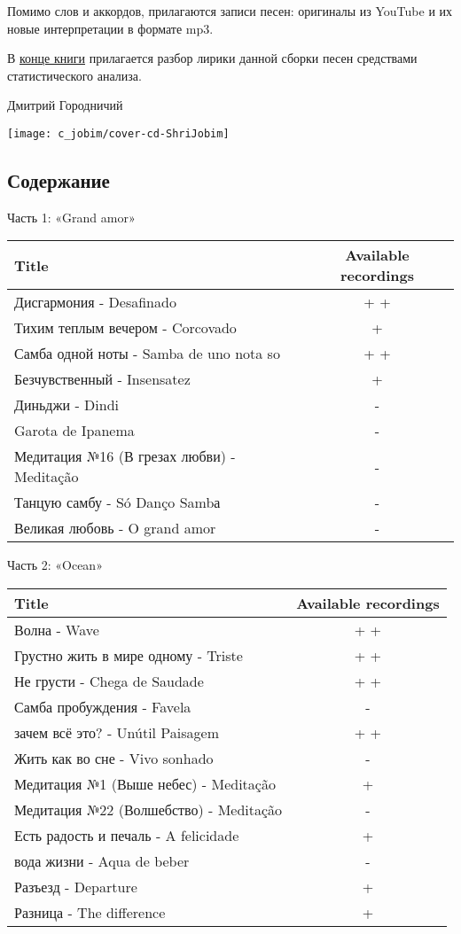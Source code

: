 \documentclass[
]{article}
\begin{document}
Помимо слов и аккордов, прилагаются записи песен: оригиналы из YouTube и их новые интерпретации в формате mp3.

В \href{TextMining.html}{конце книги} прилагается разбор лирики данной сборки песен средствами статистического анализа.

Дмитрий Городничий

\begin{center}\texttt{[image: c\_jobim/cover-cd-ShriJobim]} \end{center}

\hypertarget{ux441ux43eux434ux435ux440ux436ux430ux43dux438ux435}{%
\subsection*{Содержание}\label{ux441ux43eux434ux435ux440ux436ux430ux43dux438ux435}}

Часть 1: «Grand amor»

\begin{longtable}[]{@{}lc@{}}
\toprule
Title & Available recordings\tabularnewline
\midrule
\endhead
Дисгармония - Desafinado & + +\tabularnewline
Тихим теплым вечером - Corcovado & +\tabularnewline
Самба одной ноты - Samba de uno nota so & + +\tabularnewline
Безчувственный - Insensatez & +\tabularnewline
Диньджи - Dindi & -\tabularnewline
Garota de Ipanema & -\tabularnewline
Медитация №16 (В грезах любви) - Meditação & -\tabularnewline
Танцую самбу - Só Danço Sambа & -\tabularnewline
Великая любовь - O grand amor & -\tabularnewline
\bottomrule
\end{longtable}

Часть 2: «Ocean»

\begin{longtable}[]{@{}lc@{}}
\toprule
Title & Available recordings\tabularnewline
\midrule
\endhead
Волна - Wave & + +\tabularnewline
Грустно жить в мире одному - Triste & + +\tabularnewline
Не грусти - Chega de Saudade & + +\tabularnewline
Самба пробуждения - Favela & -\tabularnewline
зачем всё это? - Unútil Paisagem & + +\tabularnewline
Жить как во сне - Vivo sonhado & -\tabularnewline
Медитация №1 (Выше небес) - Meditação & +\tabularnewline
Медитация №22 (Волшебство) - Meditação & -\tabularnewline
Есть радость и печаль - A felicidade & +\tabularnewline
вода жизни - Aqua de beber & -\tabularnewline
Разъезд - Departure & +\tabularnewline
Разница - The difference & +\tabularnewline
\bottomrule
\end{longtable}
\end{document}
